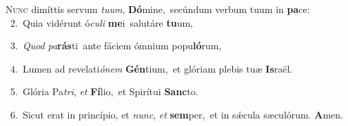 \lettrine{\initial\textcolor{\initialcolor}{N}}{unc} dimíttis servum \textit{tu}\-\textit{um}, \textbf{Dó}\-mine,~\star secúndum verbum tuum in \textbf{pa}\-ce:\\
{\numbfont\textcolor{\numbcolor}{~2.}}~Quia vidérunt ó\-\textit{cu}\-\textit{li} \textbf{me}\-i~\star salutáre \textbf{tu}\-um,\par
{\numbfont\textcolor{\numbcolor}{~3.}}~\textit{Quod} \textit{pa}\-\textbf{rás}ti~\star ante fáciem ómnium popu\-\textbf{ló}\-rum,\par
{\numbfont\textcolor{\numbcolor}{~4.}}~Lumen ad revelati\-\textit{ó}\-\textit{nem} \textbf{Gén}\-tium,~\star et glóriam plebis tuæ \textbf{Is}\-raël.\par
{\numbfont\textcolor{\numbcolor}{~5.}}~Glória Pa\-\textit{tri}\-, \textit{et} \textbf{Fí}\-lio,~\star et Spirítui \textbf{Sanc}\-to.\par
{\numbfont\textcolor{\numbcolor}{~6.}}~Sicut erat in princípio, et \textit{nunc}\-, \textit{et} \textbf{sem}\-per,~\star et in sǽcula sæculórum. \textbf{A}\-men.\par
